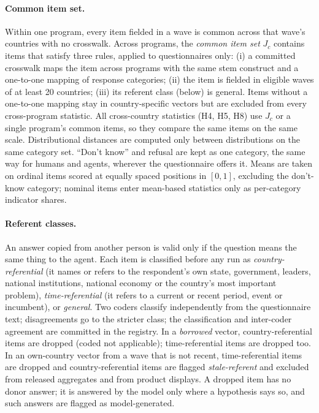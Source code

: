 \documentclass[10pt]{article}
\begin{document}
\paragraph{Common item set.} Within one program, every item fielded in a wave is common across that wave's countries with no crosswalk. Across programs, the \emph{common item set} $J_c$ contains items that satisfy three rules, applied to questionnaires only: (i) a committed crosswalk maps the item across programs with the same stem construct and a one-to-one mapping of response categories; (ii) the item is fielded in eligible waves of at least 20 countries; (iii) its referent class (below) is general. Items without a one-to-one mapping stay in country-specific vectors but are excluded from every cross-program statistic. All cross-country statistics (H4, H5, H8) use $J_c$ or a single program's common items, so they compare the same items on the same scale. Distributional distances are computed only between distributions on the same category set. ``Don't know'' and refusal are kept as one category, the same way for humans and agents, wherever the questionnaire offers it. Means are taken on ordinal items scored at equally spaced positions in $[0,1]$, excluding the don't-know category; nominal items enter mean-based statistics only as per-category indicator shares.

\paragraph{Referent classes.} An answer copied from another person is valid only if the question means the same thing to the agent. Each item is classified before any run as \emph{country-referential} (it names or refers to the respondent's own state, government, leaders, national institutions, national economy or the country's most important problem), \emph{time-referential} (it refers to a current or recent period, event or incumbent), or \emph{general}. Two coders classify independently from the questionnaire text; disagreements go to the stricter class; the classification and inter-coder agreement are committed in the registry. In a \emph{borrowed} vector, country-referential items are dropped (coded not applicable); time-referential items are dropped too. In an own-country vector from a wave that is not recent, time-referential items are dropped and country-referential items are flagged \emph{stale-referent} and excluded from released aggregates and from product displays. A dropped item has no donor answer; it is answered by the model only where a hypothesis says so, and such answers are flagged as model-generated.
\end{document}
